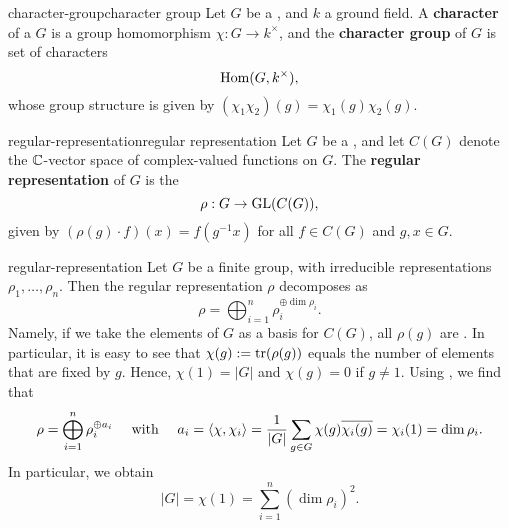 \begin{topic}{character-group}{character group}
    Let $G$ be a , and $k$ a ground field. A \textbf{character} of a $G$ is a group homomorphism $\chi : G \to k^\times$, and the \textbf{character group} of $G$ is set of characters
    \[ \text{Hom}(G, k^\times) , \]
    whose group structure is given by $(\chi_1 \chi_2)(g) = \chi_1(g) \chi_2(g)$.
\end{topic}

\begin{topic}{regular-representation}{regular representation}
    Let $G$ be a , and let $C(G)$ denote the $\mathbb{C}$-vector space of complex-valued functions on $G$. The \textbf{regular representation} of $G$ is the 
    \[ \rho : G \to \textup{GL}(C(G)) , \]
    given by $(\rho(g) \cdot f)(x) = f(g^{-1} x)$ for all $f \in C(G)$ and $g, x \in G$.
\end{topic}

\begin{example}{regular-representation}
    Let $G$ be a finite group, with irreducible representations $\rho_1, \ldots, \rho_n$. Then the regular representation $\rho$ decomposes as
    \[ \rho = \bigoplus_{i = 1}^{n} \rho_i^{\oplus \dim \rho_i} . \]
    Namely, if we take the elements of $G$ as a basis for $C(G)$, all $\rho(g)$ are . In particular, it is easy to see that $\chi(g) := \operatorname{tr}(\rho(g))$ equals the number of elements that are fixed by $g$. Hence, $\chi(1) = |G|$ and $\chi(g) = 0$ if $g \ne 1$. Using , we find that
    \[ \rho = \bigoplus_{i = 1}^{n} \rho_i^{\oplus a_i} \quad \textup{ with } \quad a_i = \langle \chi, \chi_i \rangle = \frac{1}{|G|} \sum_{g \in G} \chi(g) \overline{\chi_i(g)} = \chi_i(1) = \dim \rho_i . \]
    In particular, we obtain
    \[ |G| = \chi(1) = \sum_{i = 1}^{n} (\dim \rho_i)^2 . \]
\end{example}

